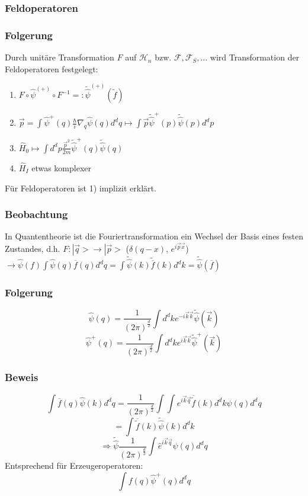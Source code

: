 \documentclass[twoside,a4paper]{scrartcl}
\renewcommand{\1}{\mathds{1}}
\newcommand{\Ra}{\Rightarrow}
\newcommand{\ra}{\rightarrow}
\renewcommand{\H}{\mathcal{H}}
\newcommand{\F}{\mathcal{F}}
\begin{document}
\subsubsection*{Feldoperatoren}
\subsubsection*{Folgerung}
Durch unitäre Transformation $F$ auf $\H_n$ bzw. $\F,\F_S,...$ wird Transformation der Feldoperatoren festgelegt:
\begin{enumerate}
\item $F \circ \hat \psi^{(+)}\circ F^{-1}=:\tilde {\hat \psi}^{(+)}(\tilde f)$
\item $\vec p=\int \hat \psi^+(q) \frac{\hbar}{i} \nabla_q \hat \psi(q)d^dq \mapsto \int \vec p \tilde {\hat \psi}^{+}(p) \tilde {\hat \psi}(p) d^dp $
\item $\hat H_0 \mapsto \int d^dp \frac{\vec p^2}{2m} \tilde {\hat \psi}^{+}(q)\tilde {\hat \psi}(q)$
\item $\hat H_I$ etwas komplexer
\end{enumerate}
Für Feldoperatoren ist 1) implizit erklärt.
\subsubsection*{Beobachtung}
In Quantentheorie ist die Fouriertransformation ein Wechsel der Basis eines festen Zustandes, d.h. $F: |\vec q> \ra |\vec p>$ ($\delta(q-x)$, $e^{i \vec p \vec x}$)\\
$\ra \hat \psi(f)\int \hat \psi(q)\overline{f}(q) d^dq=\int \tilde {\hat \psi}(k) \tilde{\overline{f}}(k)d^dk=\tilde {\hat \psi} (\overline{f}) $
\subsubsection*{Folgerung}
$$\hat \psi(q)=\frac{1}{(2\pi)^{\frac{d}{2}}}\int d^dk e^{-i\vec k\vec k} \tilde {\hat \psi}(\vec k)$$
$$\hat \psi^+(q)=\frac{1}{(2\pi)^{\frac{d}{2}}}\int d^dk e^{i\vec k\vec k} \tilde {\hat \psi}^+(\vec k)$$
\subsubsection*{Beweis}
$$\int \overline{f}(q) \hat \psi(k) d^dq=\frac{1}{(2\pi)^{\frac{d}{2}}} \int \int e^{i \vec k \vec q} \overline{\tilde{f}}(k) d^dk \hat \psi(q) d^dq$$
$$=\int \overline{\tilde{f}}(k) \tilde {\hat \psi}(k) d^dk $$
$$\Ra \tilde {\hat \psi} \frac{1}{(2\pi)^{\frac{d}{2}}}  \int  \hat e^{i \vec k \vec q} \psi(q) d^dq $$
Entsprechend für Erzeugeroperatoren:
$$\int f(q) \hat \psi^+(q)d^dq$$
% 
\end{document}
